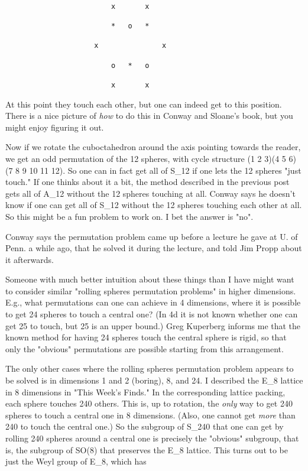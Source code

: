 \begin{verbatim}

                         x       x   

                         *   o   * 
 
                     x               x

                         o   *   o

                         x       x
\end{verbatim}
    
                         

At this point they touch each other, but one can indeed get to this position.
There is a nice picture of \emph{how} to do this in Conway and Sloane's 
book, but you might enjoy figuring it out.

Now if we rotate the cuboctahedron around the axis pointing towards
the reader, we get an odd permutation of the 12 spheres, with cycle structure
(1 2 3)(4 5 6)(7 8 9 10 11 12).  So one can in fact get all of S_{12}
if one lets the 12 spheres "just touch."  If one thinks about it a bit,
the method described in the previous post gets all of A_{12} without 
the 12 spheres touching at all.  Conway says he doesn't know if one can get 
all of S_{12} without the 12 spheres touching each other at all.  
So this might be a fun problem to work on.  I bet the answer is "no".

Conway says the permutation problem came up before a lecture he gave at 
U. of Penn. a while ago, that he solved it during the lecture, and told 
Jim Propp about it afterwards.

Someone with much better intuition about these things than I have might
want to consider similar "rolling spheres permutation problems"
in higher dimensions.  E.g., what permutations can one can achieve 
in 4 dimensions, where it is possible to get 24 spheres to touch a central 
one?  (In 4d it is not known whether one can get 25 to touch, but 25
is an upper bound.)  Greg Kuperberg informs me that the known
method for having 24 spheres touch the central sphere is rigid, so that
only the "obvious" permutations are possible starting from 
this arrangement.

The only other cases where the rolling spheres permutation problem
appears to be solved is in dimensions 1 and 2 (boring), 8, and 24.  I
described the E_{8} lattice in 8 dimensions in "This Week's Finds."  In the 
corresponding lattice packing, each sphere touches 240 others.  This is, 
up to rotation, the \emph{only} way to get 240 spheres to touch a central 
one in 8 dimensions.  (Also, one cannot get \emph{more} than 240 to touch the central one.) 
So the subgroup of S_{240} that one can get by rolling 240 spheres 
around a central one is precisely the "obvious" subgroup, that is, the 
subgroup of SO(8) that preserves the E_{8} lattice.  This turns out 
to be just the Weyl group of E_{8}, which has

